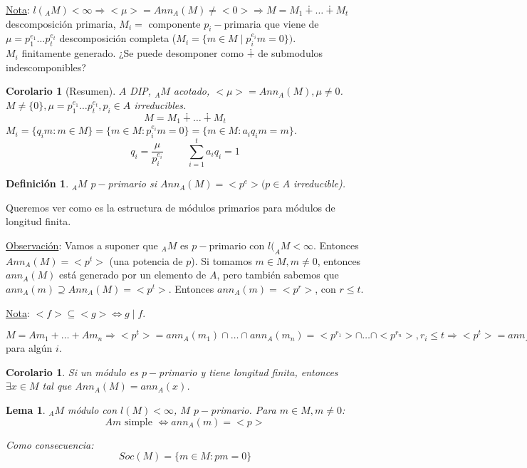 \documentclass[11pt,a4paper]{article}
\theoremstyle{break}
\newtheorem{corollary}[theorem]{Corolario}
\newtheorem{lemma}[theorem]{Lema}
\newtheorem{definition}[theorem]{Definición}
\begin{document}
\underline{Nota}: $l(_{A}M) < \infty \Rightarrow <\mu> = Ann_{A}(M) \neq <0> \Rightarrow M = M_{1} \dotplus \dots \dotplus M_{t}$ descomposición primaria, $M_{i} =$ componente $p_{i}-$primaria que viene de $\mu = p_{1}^{e_{1}} \dots p_{t}^{e_{t}}$ descomposición completa ($M_{i} = \{m \in M \mid p_{i}^{e_{i}}m = 0\})$. \\
$M_{i}$ finitamente generado. ¿Se puede desomponer como $\dotplus$ de submodulos indescomponibles?


\begin{corollary}[Resumen]

$A$ DIP, $_{A}M$ acotado, $<\mu> = Ann_{A} (M), \mu \neq 0$. \\
$M \neq \{0\}, \mu = p_{1}^{e_{1}} \dots p_{t}^{e_{t}}, p_{i} \in A$ irreducibles.
$$M = M_{1} \dotplus \dots \dotplus M_{t}$$
$M_{i} = \{q_{i}m: m \in M\} = \{m \in M: p_{i}^{e_{i}}m = 0\} = \{m \in M: a_{i}q_{i}m=m\}$.
$$q_{i} = \frac{\mu}{p_{i}^{e_{i}}} \hspace{1cm} \sum_{i=1}^{t} a_{i}q_{i} = 1$$
\end{corollary}

\begin{definition}
$_{A}M$ $p-$primario si $Ann_{A}(M) = <p^{e}> (p \in A$ irreducible).
\end{definition}

Queremos ver como es la estructura de módulos primarios para módulos de longitud finita.

\underline{Observación}: Vamos a suponer que $_{A}M$ es $p-$primario con $l(_{A}M < \infty$. Entonces $Ann_{A}(M) = <p^{t}>$ (una potencia de $p$). Si tomamos $m \in M, m \neq 0$, entonces $ann_{A}(M)$ está generado por un elemento de $A$, pero también sabemos que $ann_{A}(m) \supseteq Ann_{A}(M) = <p^{t}>$. Entonces $ann_{A}(m) = <p^{r}>$, con $r \leq t$.

\underline{Nota}: $<f> \subseteq <g> \iff g \mid f$.

$M = Am_{1} + \dots + Am_{n} \Rightarrow <p^{t}> = ann_{A}(m_{1}) \cap \dots \cap ann_{A}(m_{n}) = <p^{r_{1}}> \cap \dots \cap <p^{r_{n}}>, r_{i} \leq t \Rightarrow <p^{t}> = ann_{A}(m_{i})$ para algún $i$.

\begin{corollary}
Si un módulo es $p-$primario y tiene longitud finita, entonces $\exists x \in M$ tal que $Ann_{A}(M) = ann_{A}(x)$.
\end{corollary}

\begin{lemma}
$_{A}M$ módulo con $l(M) < \infty$, $M$ $p-$primario. Para $m \in M, m \neq 0$:
$$Am \text{ simple } \iff ann_{A}(m) = <p>$$

Como consecuencia:
$$Soc(M) = \{m \in M: pm = 0\}$$
\end{lemma}
\end{document}
